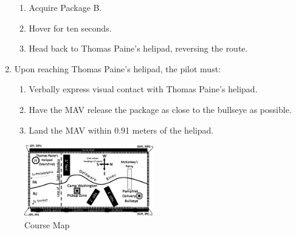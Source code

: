 \documentclass[onecolumn, oneside, letterpaper, draftclsnofoot, 10pt, compsoc]{IEEEtran}
\begin{document}
\begin{enumerate}
\begin{enumerate}
\item Acquire Package B.
\item Hover for ten seconds.
\item Head back to Thomas Paine’s helipad, reversing the route.
\end{enumerate}
\item Upon reaching Thomas Paine’s helipad, the pilot must:
\begin{enumerate}
\item Verbally express visual contact with Thomas Paine’s helipad.
\item Have the MAV release the package as close to the bullseye as possible.
\item Land the MAV within 0.91 meters of the helipad.
\end{enumerate}
\end{enumerate}
\begin{figure}[h!]
\centering
\includegraphics[width=0.5\textwidth]{graphics/course_map.eps}
\caption{Course Map}
\end{figure}
\end{document}
